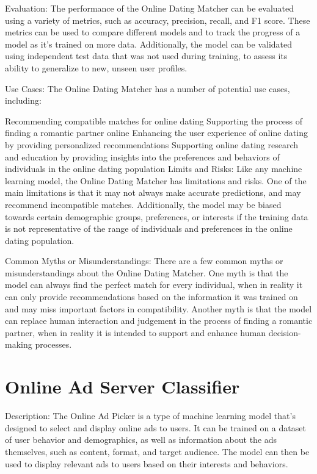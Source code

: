 Evaluation:
The performance of the Online Dating Matcher can be evaluated using a variety of metrics, such as accuracy, precision, recall, and F1 score. These metrics can be used to compare different models and to track the progress of a model as it's trained on more data. Additionally, the model can be validated using independent test data that was not used during training, to assess its ability to generalize to new, unseen user profiles.

Use Cases:
The Online Dating Matcher has a number of potential use cases, including:

Recommending compatible matches for online dating
Supporting the process of finding a romantic partner online
Enhancing the user experience of online dating by providing personalized recommendations
Supporting online dating research and education by providing insights into the preferences and behaviors of individuals in the online dating population
Limits and Risks:
Like any machine learning model, the Online Dating Matcher has limitations and risks. One of the main limitations is that it may not always make accurate predictions, and may recommend incompatible matches. Additionally, the model may be biased towards certain demographic groups, preferences, or interests if the training data is not representative of the range of individuals and preferences in the online dating population.

Common Myths or Misunderstandings:
There are a few common myths or misunderstandings about the Online Dating Matcher. One myth is that the model can always find the perfect match for every individual, when in reality it can only provide recommendations based on the information it was trained on and may miss important factors in compatibility. Another myth is that the model can replace human interaction and judgement in the process of finding a romantic partner, when in reality it is intended to support and enhance human decision-making processes.

\section{Online Ad Server Classifier}

Description:
The Online Ad Picker is a type of machine learning model that's designed to select and display online ads to users. It can be trained on a dataset of user behavior and demographics, as well as information about the ads themselves, such as content, format, and target audience. The model can then be used to display relevant ads to users based on their interests and behaviors.

